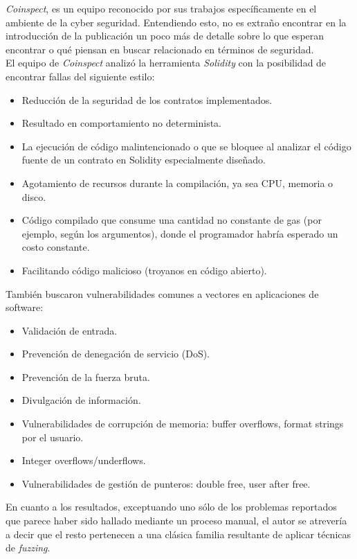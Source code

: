 \textit{Coinspect}, es un equipo reconocido por sus trabajos específicamente en el ambiente de la cyber seguridad. Entendiendo esto, no es extraño encontrar en la introducción de la publicación\cite{SolidityCompilerAuditReport} un poco más de detalle\cite{SummaryCoinspectReport} sobre lo que esperan encontrar o qué piensan en buscar relacionado en términos de seguridad.\\

El equipo de \textit{Coinspect} analizó la herramienta \textit{Solidity} con la posibilidad de encontrar fallas del siguiente estilo:
\begin{itemize}
    \item Reducción de la seguridad de los contratos implementados.
    \item Resultado en comportamiento no determinista.
    \item La ejecución de código malintencionado o que se bloquee al analizar el código fuente de un contrato en Solidity especialmente diseñado.
    \item Agotamiento de recursos durante la compilación, ya sea CPU, memoria o disco.
    \item Código compilado que consume una cantidad no constante de gas (por ejemplo, según los argumentos), donde el programador habría esperado un costo constante.
    \item Facilitando código malicioso (troyanos en código abierto).\newline
\end{itemize}

También buscaron vulnerabilidades comunes a vectores en aplicaciones de software:
\begin{itemize}
    \item Validación de entrada.
    \item Prevención de denegación de servicio (DoS).
    \item Prevención de la fuerza bruta.
    \item Divulgación de información.
    \item Vulnerabilidades de corrupción de memoria: buffer overflows, format strings por el usuario.
    \item Integer overflows/underflows.
    \item Vulnerabilidades de gestión de punteros: double free, user after free.
\end{itemize}


En cuanto a los resultados, exceptuando uno sólo de los problemas reportados que parece haber sido hallado mediante un proceso manual, el autor se atrevería a decir que el resto pertenecen a una clásica familia resultante de aplicar técnicas de \textit{fuzzing}.\\

